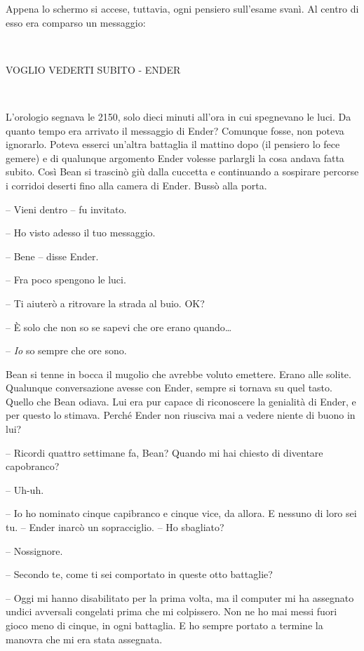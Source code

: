 {Appena lo schermo si accese, tuttavia, ogni pensiero sull'esame svanì.
	Al centro di esso era comparso un messaggio:}

{~}

\begin{center}
	{VOGLIO VEDERTI SUBITO - ENDER}
\end{center}

{~}

{L'orologio segnava le 2150, solo dieci minuti all'ora in cui spegnevano
	le luci. Da quanto tempo era arrivato il messaggio di Ender? Comunque
	fosse, non poteva ignorarlo. Poteva esserci un'altra battaglia il
	mattino dopo (il pensiero lo fece gemere) e di qualunque argomento Ender
	volesse parlargli la cosa andava fatta subito. Così Bean si trascinò giù
	dalla cuccetta e continuando a sospirare percorse i corridoi deserti
	fino alla camera di Ender. Bussò alla porta.}

{-- Vieni dentro -- fu invitato.}

{-- Ho visto adesso il tuo messaggio.}

{-- Bene -- disse Ender.}

{-- Fra poco spengono le luci.}

{-- Ti aiuterò a ritrovare la strada al buio. OK?}

{-- È solo che non so se sapevi che ore erano quando\ldots{}}

{-- \emph{Io} so sempre che ore sono.}

{Bean si tenne in bocca il mugolio che avrebbe voluto emettere. Erano
	alle solite. Qualunque conversazione avesse con Ender, sempre si tornava
	su quel tasto. Quello che Bean odiava. Lui era pur capace di riconoscere
	la genialità di Ender, e per questo lo stimava. Perché Ender non
	riusciva mai a vedere niente di buono in lui?}

{-- Ricordi quattro settimane fa, Bean? Quando mi hai chiesto di
	diventare capobranco?}

{-- Uh-uh.}

{-- Io ho nominato cinque capibranco e cinque vice, da allora. E nessuno
	di loro sei tu. -- Ender inarcò un sopracciglio. -- Ho sbagliato?}

{-- Nossignore.}

{-- Secondo te, come ti sei comportato in queste otto battaglie?}

{-- Oggi mi hanno disabilitato per la prima volta, ma il computer mi ha
	assegnato undici avversali congelati prima che mi colpissero. Non ne ho
	mai messi fuori gioco meno di cinque, in ogni battaglia. E ho sempre
	portato a termine la manovra che mi era stata assegnata.}

